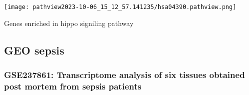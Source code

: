 \documentclass[
]{article}
\begin{document}
\def\@captype{figure}
\begin{center}
\texttt{[image: pathview2023-10-06\_15\_12\_57.141235/hsa04390.pathview.png]}
\caption{Genes enriched in hippo signiling pathway}\label{fig:genes-enriched-in-hippo-signiling-pathway}
\end{center}

\hypertarget{geo-sepsis}{%
\subsection{GEO sepsis}\label{geo-sepsis}}

\hypertarget{gse237861-transcriptome-analysis-of-six-tissues-obtained-post-mortem-from-sepsis-patients}{%
\subsubsection{GSE237861: Transcriptome analysis of six tissues obtained post mortem from sepsis patients}\label{gse237861-transcriptome-analysis-of-six-tissues-obtained-post-mortem-from-sepsis-patients}}
\end{document}
